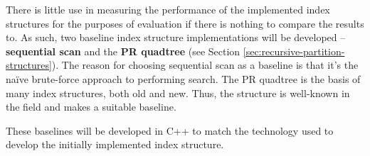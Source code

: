 There is little use in measuring the performance of the implemented index structures for the purposes of evaluation if there is nothing to compare the results to. As such, two baseline index structure implementations will be developed -- \textbf{sequential scan} and the \textbf{PR quadtree} (see Section \ref{sec:recursive-partition-structures}). The reason for choosing sequential scan as a baseline is that it's the na\"{i}ve brute-force approach to performing search. The PR quadtree is the basis of many index structures, both old and new. Thus, the structure is well-known in the field and makes a suitable baseline.

These baselines will be developed in C++ to match the technology used to develop the initially implemented index structure.
